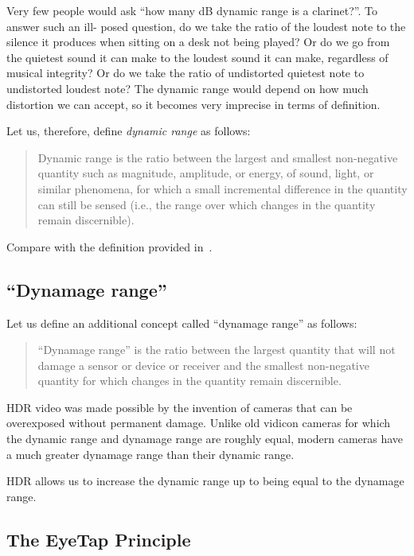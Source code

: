 Very few people would ask ``how many dB dynamic range is a clarinet?''.  To answer such an ill-
posed question, do we take the ratio of the loudest note to the silence it produces when sitting on a
desk not being played? Or do we go from the quietest sound it can make to the loudest sound it
can make, regardless of musical integrity?  Or do we take the ratio of undistorted quietest note to 
undistorted loudest note?  The dynamic range would depend on how much distortion we can accept, 
so it becomes very
imprecise in terms of definition.

Let us, therefore, define {\em dynamic range} as follows:
\begin{quote}
  Dynamic range is the ratio
    between the largest and smallest non-negative quantity such
    as magnitude, amplitude, or energy, of
    sound, light, or similar phenomena, for 
    which a small incremental difference in the quantity can still be
    sensed (i.e., the range over which changes in the quantity remain
    discernible).
\end{quote}
Compare with the definition provided in~\cite{tei2011}.
 
\subsection{``Dynamage range''}
 
Let us define an additional concept called ``dynamage range'' as follows:
\begin{quote}
  ``Dynamage range'' is the ratio between the largest quantity
    that will not damage a sensor or device or receiver and the
    smallest non-negative quantity for which changes in the quantity
    remain discernible.
\end{quote}

HDR video was made possible by the invention of cameras that can be overexposed without 
permanent damage.  Unlike old vidicon cameras \cite{Vidiconc95:online} for which the dynamic range 
and dynamage range are roughly equal, modern cameras have a much greater dynamage range 
than their dynamic range.

HDR allows us to increase the dynamic range up to being equal to the dynamage range.


 
\subsection{The EyeTap Principle}
 
